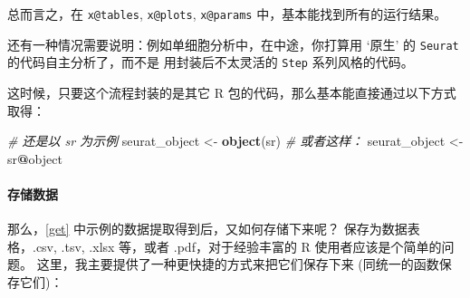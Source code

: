 \documentclass[
]{article}
\newenvironment{Shaded}{\begin{snugshade}}{\end{snugshade}}
\newcommand{\CommentTok}[1]{\textcolor[rgb]{0.56,0.35,0.01}{\textit{#1}}}
\newcommand{\KeywordTok}[1]{\textcolor[rgb]{0.13,0.29,0.53}{\textbf{#1}}}
\newcommand{\NormalTok}[1]{#1}
\newcommand{\OperatorTok}[1]{\textcolor[rgb]{0.81,0.36,0.00}{\textbf{#1}}}
\newcommand{\StringTok}[1]{\textcolor[rgb]{0.31,0.60,0.02}{#1}}
\begin{document}
\begin{Shaded}
\end{Shaded}

总而言之，在 \texttt{x@tables}, \texttt{x@plots}, \texttt{x@params} 中，基本能找到所有的运行结果。

还有一种情况需要说明：例如单细胞分析中，在中途，你打算用 `原生' 的 \texttt{Seurat} 的代码自主分析了，而不是
用封装后不太灵活的 \texttt{Step} 系列风格的代码。

这时候，只要这个流程封装的是其它 R 包的代码，那么基本能直接通过以下方式取得：

\begin{Shaded}
\begin{Highlighting}[]
\CommentTok{\# 还是以 \textasciigrave{}sr\textasciigrave{} 为示例}
\NormalTok{seurat\_object \textless{}{-}}\StringTok{ }\KeywordTok{object}\NormalTok{(sr)}
\CommentTok{\# 或者这样：}
\NormalTok{seurat\_object \textless{}{-}}\StringTok{ }\NormalTok{sr}\OperatorTok{@}\NormalTok{object}
\end{Highlighting}
\end{Shaded}

\hypertarget{ux5b58ux50a8ux6570ux636e}{%
\paragraph{存储数据}\label{ux5b58ux50a8ux6570ux636e}}

那么，\ref{get} 中示例的数据提取得到后，又如何存储下来呢？
保存为数据表格，.csv, .tsv, .xlsx 等，或者 .pdf，对于经验丰富的 R 使用者应该是个简单的问题。
这里，我主要提供了一种更快捷的方式来把它们保存下来 (同统一的函数保存它们)：
\end{document}
